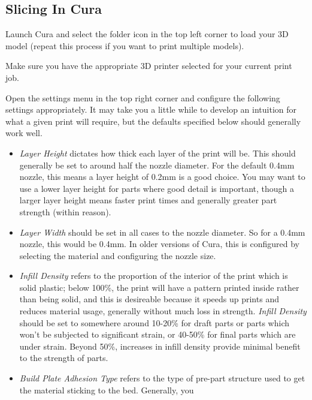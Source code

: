 \documentclass[12pt]{report}
\begin{document}
\subsection*{Slicing In Cura}
\label{sec:slicing}

Launch Cura and select the folder icon in the top left corner to load your 3D
model (repeat this process if you want to print multiple models). \par
Make sure you have the appropriate 3D printer selected for your current print
job. \par
Open the settings menu in the top right corner and configure the following
settings appropriately. It may take you a little while to develop an intuition
for what a given print will require, but the defaults specified below should
generally work well.

\begin{itemize}
    \item \textit{Layer Height} dictates how thick each layer of the print will
        be. This should generally be set to around half the
        nozzle diameter. For the default 0.4mm nozzle, this means a layer height
        of 0.2mm is a good choice. You may want to use a lower layer height for
        parts where good detail is important, though a larger layer height means
        faster print times and generally greater part strength (within reason).
    \item \textit{Layer Width} should be set in all cases to the nozzle
        diameter. So for a 0.4mm nozzle, this would be 0.4mm. In older versions
        of Cura, this is configured by selecting the material and configuring
        the nozzle size.
    \item \textit{Infill Density} refers to the proportion of the interior of
        the print which is solid plastic; below 100\%, the print will have a
        pattern printed inside rather than being solid, and this is desireable
        because it speeds up prints and reduces material usage, generally
        without much loss in strength. \textit{Infill Density} should be set
        to somewhere around 10-20\% for draft parts or parts which won't be
        subjected to significant strain, or 40-50\% for final parts which are
        under strain. Beyond 50\%, increases in infill density provide minimal
        benefit to the strength of parts.
    \item \textit{Build Plate Adhesion Type} refers to the type of pre-part
        structure used to get the material sticking to the bed. Generally, you

\end{itemize}
\end{document}
